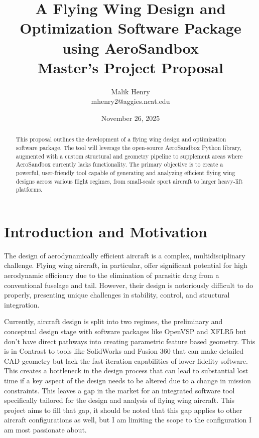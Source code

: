 \documentclass[12pt]{article}
\title{\textbf{A Flying Wing Design and Optimization Software Package using AeroSandbox} \\ \large Master's Project Proposal}
\author{Malik Henry \\ mhenry2@aggies.ncat.edu}
\date{November 26, 2025}
\begin{document}
\maketitle

\begin{abstract}
This proposal outlines the development of a flying wing design and optimization software package. The tool will leverage the open-source AeroSandbox Python library, augmented with a custom structural and geometry pipeline to supplement areas where AeroSandbox currently lacks functionality. The primary objective is to create a powerful, user-friendly tool capable of generating and analyzing efficient flying wing designs across various flight regimes, from small-scale sport aircraft to larger heavy-lift platforms.
\end{abstract}

\tableofcontents
\newpage

\section{Introduction and Motivation}
The design of aerodynamically efficient aircraft is a complex, multidisciplinary challenge. Flying wing aircraft, in particular, offer significant potential for high aerodynamic efficiency due to the elimination of parasitic drag from a conventional fuselage and tail. However, their design is notoriously difficult to do properly, presenting unique challenges in stability, control, and structural integration.

Currently, aircraft design is split into two regimes, the preliminary and conceptual design stage with software packages like OpenVSP and XFLR5 but don't have direct pathways into creating parametric feature based geometry. This is in Contrast to tools like SolidWorks and Fusion 360 that can make detailed CAD geometry but lack the fast iteration capabilities of lower fidelity software. This creates a bottleneck in the design process that can lead to substantial lost time if a key aspect of the design needs to be altered due to a change in mission constraints. This leaves a gap in the market for an integrated software tool specifically tailored for the design and analysis of flying wing aircraft. This project aims to fill that gap, it should be noted that this gap applies to other aircraft configurations as well, but I am limiting the scope to the configuration I am most passionate about.
\end{document}
